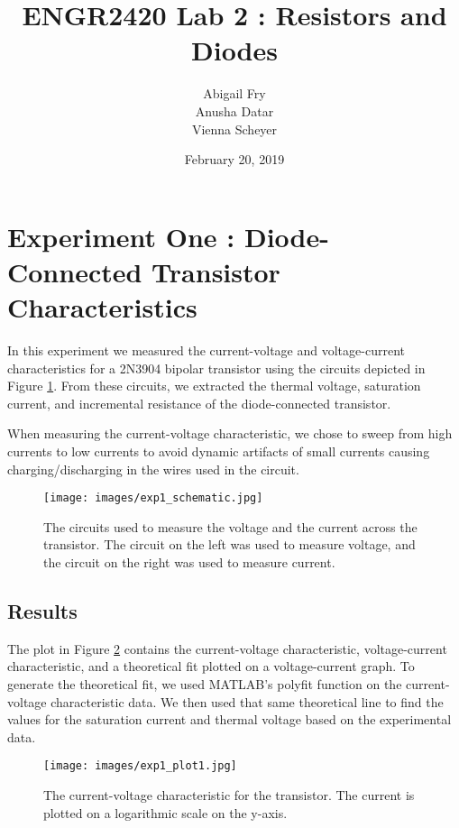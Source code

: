 \documentclass{article}
\title{ENGR2420 Lab 2 : Resistors and Diodes}
\author{Abigail Fry \\ Anusha Datar \\ Vienna Scheyer}
\date{February 20, 2019}
\begin{document}
\maketitle

\section{Experiment One : Diode-Connected Transistor Characteristics}
In this experiment we measured the current-voltage and voltage-current characteristics for a 2N3904 bipolar transistor using the circuits depicted in Figure \ref{fig:exp1}. From these circuits, we extracted the thermal voltage, saturation current, and incremental resistance of the diode-connected transistor.

When measuring the current-voltage characteristic, we chose to sweep from high currents to low currents to avoid dynamic artifacts of small currents causing charging/discharging in the wires used in the circuit. 

\begin{figure}[H]   
  \centering        
  \texttt{[image: images/exp1\_schematic.jpg]}
  \caption{The circuits used to measure the voltage and the current across the transistor. The circuit on the left was used to measure voltage, and the circuit on the right was used to measure current.}   
  \label{fig:exp1}
\end{figure}

\subsection{Results}

\newline
\newline
The plot in Figure \ref{fig:plot1} contains the current-voltage characteristic, voltage-current characteristic, and a theoretical fit plotted on a voltage-current graph.  To generate the theoretical fit, we used MATLAB's polyfit function on the current-voltage characteristic data.  We then used that same theoretical line to find the values for the saturation current and thermal voltage based on the experimental data.
\begin{figure}[H]   
  \centering        
  \texttt{[image: images/exp1\_plot1.jpg]}
  \caption{The current-voltage characteristic for the transistor. The current is plotted on a logarithmic scale on the y-axis.}   
  \label{fig:plot1}
\end{figure}
\end{document}
